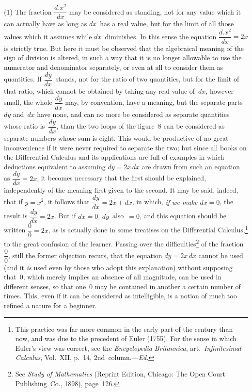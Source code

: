 \documentclass[12pt]{book}[2005/09/16]
\newcommand{\Pagelabel}[1]{\phantomsection\label{page:#1}}
\newcommand{\PageSep}[1]{\Pagelabel{#1}\ignorespaces}
\newcommand{\Ed}{\textit{Ed}}
\renewcommand{\(}{{\upshape(}}
\renewcommand{\)}{{\upshape)}}
\newcommand{\Title}[1]{\textit{#1}}
\begin{document}
(1) The fraction $\dfrac{d.x^{2}}{dx}$ may be considered as standing,
not for any value which it can actually have as
long as $dx$~has a real value, but for the limit of all
those values which it assumes while $dx$~diminishes.
In this sense the equation $\dfrac{d.x^{2}}{dx} = 2x$ is strictly true.
But here it must be observed that the algebraical
meaning of the sign of division is altered, in such a
way that it is no longer allowable to use the numerator
and denominator separately, or even at all to consider
\PageSep{27}
them as quantities. If $\dfrac{dy}{dx}$~stands, not for the
ratio of two quantities, but for the limit of that ratio,
which cannot be obtained by taking any real value of~$dx$,
however small, the whole $\dfrac{dy}{dx}$ may, by convention,
have a meaning, but the separate parts $dy$ and~$dx$
have none, and can no more be considered as separate
quantities whose ratio is~$\dfrac{dy}{dx}$, than the two loops
of the figure~$8$ can be considered as separate numbers
whose sum is eight. This would be productive of no
great inconvenience if it were never required to separate
the two; but since all books on the Differential
Calculus and its applications are full of examples in
which deductions equivalent to assuming $dy = 2x\, dx$
are drawn from such an equation as $\dfrac{dy}{dx} = 2x$, it becomes
necessary that the first should be explained, independently
of the meaning first given to the second.
It may be said, indeed, that if $y = x^{2}$, it follows that
$\dfrac{dy}{dx} = 2x + dx$, in which, \emph{if we make $dx = 0$}, the result
is $\dfrac{dy}{dx} = 2x$. But if $dx = 0$, $dy$~also~$= 0$, and this
equation should be written $\dfrac{0}{0} = 2x$, as is actually done
in some treatises on the Differential Calculus,\footnote
  {This practice was far more common in the early part of the century
  than now, and was due to the precedent of Euler (1755). For the sense in
%
  which Euler's view was correct, see the \Title{Encyclopedia Britannica}, art.\ \Title{Infinitesimal
  Calculus}, Vol.~XII, p.~14, 2nd~column.---\Ed.}
to the
great confusion of the learner. Passing over the difficulties\footnote
  {See \Title{Study of Mathematics} (Reprint Edition, Chicago: The Open Court
  Publishing~Co., 1898), page~126.}
of the fraction~$\dfrac{0}{0}$, still the former objection
recurs, that the equation $dy = 2x\, dx$ cannot be used
\PageSep{28}
(and it \emph{is} used even by those who adopt this explanation)
without supposing that~$0$, which merely implies
an absence of all magnitude, can be used in different
senses, so that one~$0$ may be contained in another a
certain number of times. This, even if it can be considered
as intelligible, is a notion of much too refined
a nature for a beginner.
\end{document}

